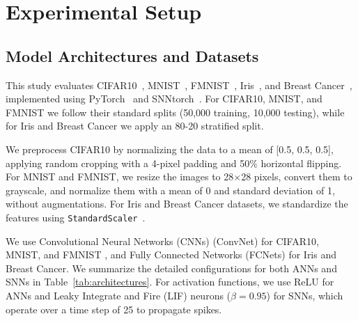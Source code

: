 \section{Experimental Setup}



\subsection{Model Architectures and Datasets}\label{subsec:model_arch_datasets}

\noindent
This study evaluates CIFAR10~\cite{cifar10}, MNIST~\cite{lecun2010mnist}, FMNIST~\cite{xiao2017fashion}, Iris~\cite{omelina2021survey}, and Breast Cancer~\cite{misc_breast_cancer_14}, implemented using PyTorch~\cite{ketkar2021introduction} and SNNtorch~\cite{eshraghian2021training}. For CIFAR10, MNIST, and FMNIST we follow their standard splits (50,000 training, 10,000 testing), while for Iris and Breast Cancer we apply an 80-20 stratified split.

We preprocess CIFAR10 by normalizing the data to a mean of [0.5, 0.5, 0.5], applying random cropping with a 4-pixel padding and 50\% horizontal flipping. For MNIST and FMNIST, we resize the images to 28×28 pixels, convert them to grayscale, and normalize them with a mean of 0 and standard deviation of 1, without augmentations. For Iris and Breast Cancer datasets, we standardize the features using \texttt{StandardScaler}~\cite{scikit-learn}.

We use Convolutional Neural Networks (CNNs) (ConvNet) for CIFAR10, MNIST, and FMNIST , and Fully Connected Networks (FCNets) for Iris and Breast Cancer. We summarize the detailed configurations for both ANNs and SNNs in Table~\ref{tab:architectures}. For activation functions, we use ReLU for ANNs and Leaky Integrate and Fire (LIF) neurons (\( \beta = 0.95\)) for SNNs, which operate over a time step of 25 to propagate spikes.


